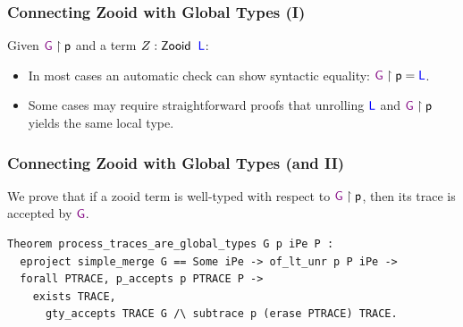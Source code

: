 \begin{frame}[fragile]
  \frametitle{Connecting Zooid with Global Types (I)}
  Given $\G \upharpoonright \p$ and a term $Z : \mathsf{Zooid}\hspace{.2cm}\lT$:
  \begin{itemize}
    \item In most cases an automatic check can show syntactic equality: $\G
      \upharpoonright \p = \lT$.
    \item Some cases may require straightforward proofs that unrolling $\lT$ and
$\G \upharpoonright \p$ yields the same local type.
  \end{itemize}
\end{frame}

\begin{frame}[fragile]
  \frametitle{Connecting Zooid with Global Types (and II)}
  We prove that if a zooid term is well-typed with respect to $\G \upharpoonright\p$,
  then its trace is accepted by $\G$.

  \begin{sticky}
    \small
    \vspace{-.9cm}
  \begin{verbatim}
Theorem process_traces_are_global_types G p iPe P :
  eproject simple_merge G == Some iPe -> of_lt_unr p P iPe ->
  forall PTRACE, p_accepts p PTRACE P ->
    exists TRACE,
      gty_accepts TRACE G /\ subtrace p (erase PTRACE) TRACE.
  \end{verbatim}
  \end{sticky}
\end{frame}

